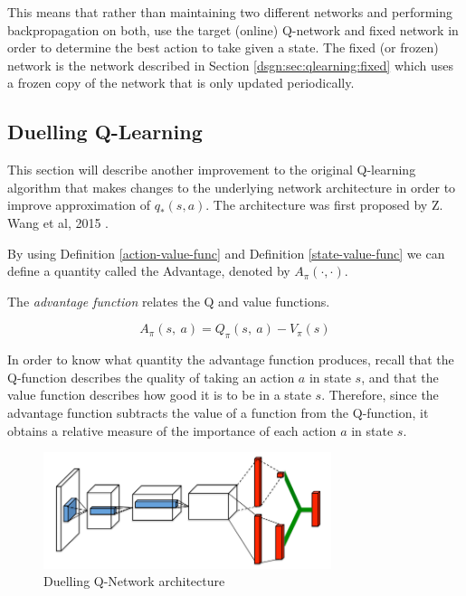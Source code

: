 This means that rather than maintaining two different networks and performing backpropagation on both, use the target (online) Q-network and fixed network in order to determine the best action to take given a state. The fixed (or frozen) network is the network described in Section \ref{dsgn:sec:qlearning:fixed} which uses a frozen copy of the network that is only updated periodically.

\subsection{Duelling Q-Learning}
\label{dsgn:sec:qlearning:dueldqn}

This section will describe another improvement to the original Q-learning algorithm that makes changes to the underlying network architecture in order to improve approximation of $q_*(s, a)$. The architecture was first proposed by Z. Wang et al, 2015 \cite{wang2015dueling}.

By using Definition \ref{action-value-func} and Definition \ref{state-value-func} we can define a quantity called the Advantage, denoted by $A_\pi(\cdot, \cdot)$.

\begin{defn}
	\label{advantage-func}
	The \textit{advantage function} relates the Q and value functions.

	\[
		A_\pi(s,~a) = Q_\pi(s,~a) - V_\pi(s)
	\]
\end{defn}

In order to know what quantity the advantage function produces, recall that the Q-function describes the quality of taking an action $a$ in state $s$, and that the value function describes how good it is to be in a state $s$. Therefore, since the advantage function subtracts the value of a function from the Q-function, it obtains a relative measure of the importance of each action $a$ in state $s$.

\begin{figure}[htbp]
	\centering
	\includegraphics[width=0.75\textwidth]{chapters/chapter3/images/duelling.png}
	\caption{Duelling Q-Network architecture
		\label{fig:duelling-arch}
	}
\end{figure}

